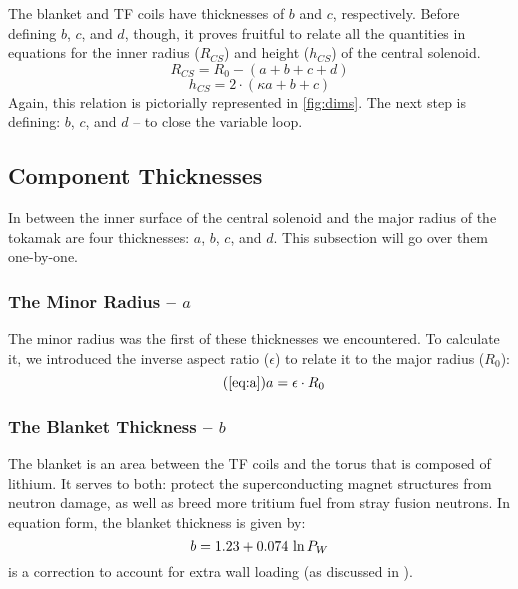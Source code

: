 \begin{figure*}
\centering

\caption{Dimensions of Tokamak Cross-Section}
\label{fig:dims}
\end{figure*}

The blanket and TF coils have thicknesses of $b$ and $c$, respectively. Before defining $b$, $c$, and $d$, though, it proves fruitful to relate all the quantities in equations for the inner radius ($R_{CS}$) and height ($h_{CS}$) of the central solenoid.
 \begin{equation}
 	\label{eq:rcs1}
 	R_{CS} = R_0 - ( a + b + c + d )
 \end{equation}
 \begin{equation}
	\label{eq:hcs1}
 	h_{CS} = 2 \cdot \left ( \kappa a + b + c \right)
 \end{equation}
Again, this relation is pictorially represented in \cref{fig:dims}. The next step is defining: $b$, $c$, and $d$ -- to close the variable loop.

\subsection{ Component Thicknesses}
 
In between the inner surface of the central solenoid and the major radius of the tokamak are four thicknesses: $a$, $b$, $c$, and $d$. This subsection will go over them one-by-one.
 
\subsubsection{The Minor Radius -- $a$}

The minor radius was the first of these thicknesses we encountered. To calculate it, we introduced the inverse aspect ratio ($\epsilon$) to relate it to the major radius ($R_0$):
\begin{equation}
	\tag{\ref{eq:a}}
	a = \epsilon \cdot R_0
\end{equation}
 
\subsubsection{The Blanket Thickness -- $b$}

The blanket is an area between the TF coils and the torus that is  composed  of lithium. It serves to both: protect the superconducting magnet structures from neutron damage, as well as breed  more tritium fuel from stray fusion neutrons. In equation form, the blanket thickness is given by: \cite{minervini}
\begin{equation}
	\label{eq:bb}
	b = 1.23 + 0.074 \ \textnormal{ln} \, P_W
\end{equation}
  is a correction to account for extra wall loading (as discussed in ). 

